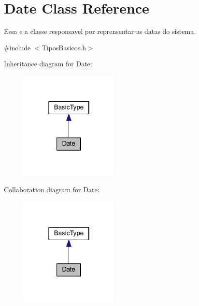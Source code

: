 \hypertarget{class_date}{\section{Date Class Reference}
\label{class_date}
}


Essa e a classe responsavel por reprensentar as datas do sistema.  




{\ttfamily \#include $<$Tipos\-Basicos.\-h$>$}



Inheritance diagram for Date\-:\nopagebreak
\begin{figure}[H]
\begin{center}
\leavevmode
\includegraphics[width=142pt]{class_date__inherit__graph}
\end{center}
\end{figure}


Collaboration diagram for Date\-:\nopagebreak
\begin{figure}[H]
\begin{center}
\leavevmode
\includegraphics[width=142pt]{class_date__coll__graph}
\end{center}
\end{figure}
